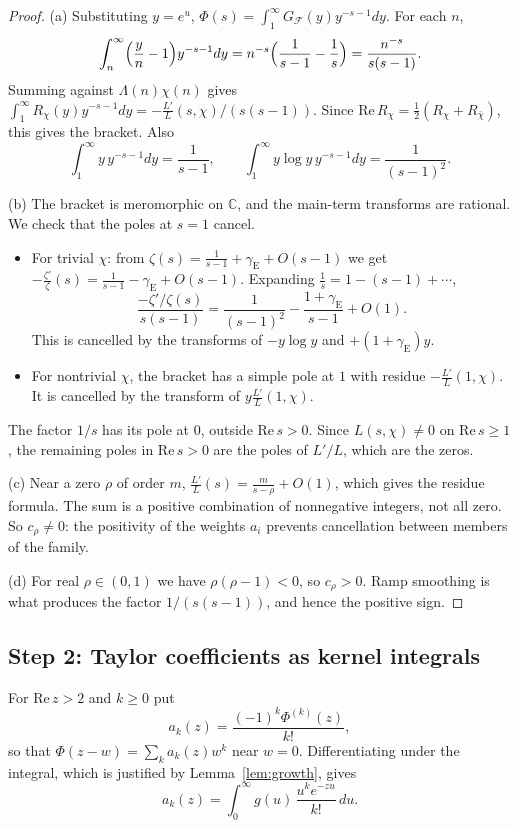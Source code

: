 \documentclass[11pt]{amsart}
\theoremstyle{definition}
\theoremstyle{remark}
\begin{document}
\begin{proof}
(a) Substituting $y=e^u$, $\Phi(s)=\int_1^\infty G_{\mathcal F}(y)y^{-s-1}dy$. For each $n$,
\[
\int_n^\infty\Bigl(\frac yn-1\Bigr)y^{-s-1}dy=n^{-s}\Bigl(\frac1{s-1}-\frac1s\Bigr)=\frac{n^{-s}}{s(s-1)}.
\]
Summing against $\Lambda(n)\chi(n)$ gives $\int_1^\infty R_\chi(y)y^{-s-1}dy=-\frac{L'}{L}(s,\chi)/(s(s-1))$. Since $\mathrm{Re}\,R_\chi=\tfrac12(R_\chi+R_{\bar\chi})$, this gives the bracket. Also
\[
\int_1^\infty y\,y^{-s-1}dy=\frac1{s-1},\qquad \int_1^\infty y\log y\,y^{-s-1}dy=\frac1{(s-1)^2}.
\]

(b) The bracket is meromorphic on $\mathbb C$, and the main-term transforms are rational. We check that the poles at $s=1$ cancel.
\begin{itemize}
\item For trivial $\chi$: from $\zeta(s)=\frac1{s-1}+\gamma_{\mathrm E}+O(s-1)$ we get $-\frac{\zeta'}{\zeta}(s)=\frac1{s-1}-\gamma_{\mathrm E}+O(s-1)$. Expanding $\frac1s=1-(s-1)+\cdots$,
\[
\frac{-\zeta'/\zeta(s)}{s(s-1)}=\frac1{(s-1)^2}-\frac{1+\gamma_{\mathrm E}}{s-1}+O(1).
\]
This is cancelled by the transforms of $-y\log y$ and $+(1+\gamma_{\mathrm E})y$.
\item For nontrivial $\chi$, the bracket has a simple pole at $1$ with residue $-\frac{L'}{L}(1,\chi)$. It is cancelled by the transform of $y\frac{L'}{L}(1,\chi)$.
\end{itemize}
The factor $1/s$ has its pole at $0$, outside $\mathrm{Re}\,s>0$. Since $L(s,\chi)\neq0$ on $\mathrm{Re}\,s\ge1$, the remaining poles in $\mathrm{Re}\,s>0$ are the poles of $L'/L$, which are the zeros.

(c) Near a zero $\rho$ of order $m$, $\frac{L'}{L}(s)=\frac{m}{s-\rho}+O(1)$, which gives the residue formula. The sum is a positive combination of nonnegative integers, not all zero. So $c_\rho\neq0$: the positivity of the weights $a_i$ prevents cancellation between members of the family.

(d) For real $\rho\in(0,1)$ we have $\rho(\rho-1)<0$, so $c_\rho>0$. Ramp smoothing is what produces the factor $1/(s(s-1))$, and hence the positive sign.
\end{proof}

\subsection{Step 2: Taylor coefficients as kernel integrals}
For $\mathrm{Re}\,z>2$ and $k\ge0$ put
\[
a_k(z)=\frac{(-1)^k\Phi^{(k)}(z)}{k!},
\]
so that $\Phi(z-w)=\sum_k a_k(z)w^k$ near $w=0$. Differentiating under the integral, which is justified by Lemma~\ref{lem:growth}, gives
\begin{equation}\label{eq:coeff}
a_k(z)=\int_0^\infty g(u)\,\frac{u^k e^{-zu}}{k!}\,du .
\end{equation}
\end{document}
